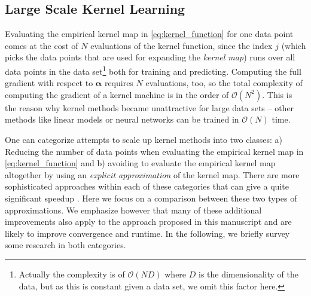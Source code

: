 \documentclass{article} %
\newcommand{\va}{\boldsymbol{\alpha}}
\begin{document}
\subsection{Large Scale Kernel Learning}\label{sec:large_scale_kernel_learning}
Evaluating the empirical kernel map in \autoref{eq:kernel_function} for one data point comes at the cost of $N$ evaluations of the kernel function, since the index $j$ (which picks the data points that are used for expanding the {\em kernel map}) runs over all data points in the data set\footnote{Actually the complexity is of $\mathcal{O}(ND)$ where $D$ is the dimensionality of the data, but as this is constant given a data set, we omit this factor here.} both for training and predicting. Computing the full gradient with respect to $\va$ requires $N$ evaluations, too, so the total complexity of computing the gradient of a kernel machine is in the order of $\mathcal{O}(N^2)$. This is the reason why kernel methods became unattractive for large data sets -- other methods like linear models or neural networks can be trained in $\mathcal{O}(N)$ time. 

One can categorize attempts to scale up kernel methods into two classes: a) Reducing the number of data points when evaluating the empirical kernel map in \autoref{eq:kernel_function} and b) avoiding to evaluate the empirical kernel map altogether by using an {\em explicit approximation} of the kernel map. There are more sophisticated approaches within each of these categories that can give a quite significant speedup \cite{Le2013, Rudi2015}. Here we focus on a comparison between these two types of approximations. We emphasize however that many of these additional improvements also apply to the approach proposed in this manuscript and are likely to improve convergence and runtime. In the following, we briefly survey some research in both categories.
\end{document}
